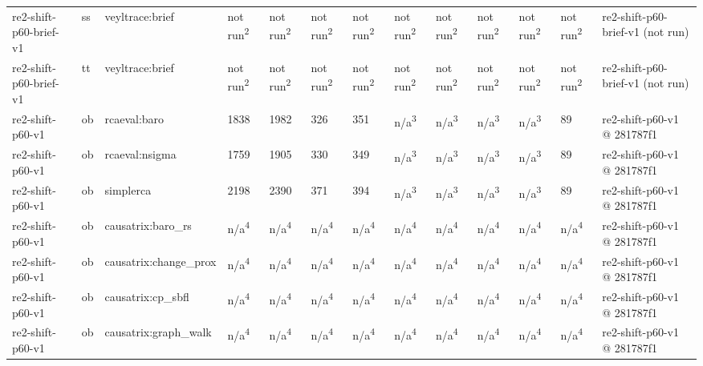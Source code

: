 \begin{table}[t]
\begin{tabular}{lllllllllllll}
re2-shift-p60-brief-v1 & ss & veyltrace:brief & not run\textsuperscript{2} & not run\textsuperscript{2} & not run\textsuperscript{2} & not run\textsuperscript{2} & not run\textsuperscript{2} & not run\textsuperscript{2} & not run\textsuperscript{2} & not run\textsuperscript{2} & not run\textsuperscript{2} & re2-shift-p60-brief-v1 (not run) \\
re2-shift-p60-brief-v1 & tt & veyltrace:brief & not run\textsuperscript{2} & not run\textsuperscript{2} & not run\textsuperscript{2} & not run\textsuperscript{2} & not run\textsuperscript{2} & not run\textsuperscript{2} & not run\textsuperscript{2} & not run\textsuperscript{2} & not run\textsuperscript{2} & re2-shift-p60-brief-v1 (not run) \\
re2-shift-p60-v1 & ob & rcaeval:baro & 1838 & 1982 & 326 & 351 & n/a\textsuperscript{3} & n/a\textsuperscript{3} & n/a\textsuperscript{3} & n/a\textsuperscript{3} & 89 & re2-shift-p60-v1 @ 281787f1 \\
re2-shift-p60-v1 & ob & rcaeval:nsigma & 1759 & 1905 & 330 & 349 & n/a\textsuperscript{3} & n/a\textsuperscript{3} & n/a\textsuperscript{3} & n/a\textsuperscript{3} & 89 & re2-shift-p60-v1 @ 281787f1 \\
re2-shift-p60-v1 & ob & simplerca & 2198 & 2390 & 371 & 394 & n/a\textsuperscript{3} & n/a\textsuperscript{3} & n/a\textsuperscript{3} & n/a\textsuperscript{3} & 89 & re2-shift-p60-v1 @ 281787f1 \\
re2-shift-p60-v1 & ob & causatrix:baro\_rs & n/a\textsuperscript{4} & n/a\textsuperscript{4} & n/a\textsuperscript{4} & n/a\textsuperscript{4} & n/a\textsuperscript{4} & n/a\textsuperscript{4} & n/a\textsuperscript{4} & n/a\textsuperscript{4} & n/a\textsuperscript{4} & re2-shift-p60-v1 @ 281787f1 \\
re2-shift-p60-v1 & ob & causatrix:change\_prox & n/a\textsuperscript{4} & n/a\textsuperscript{4} & n/a\textsuperscript{4} & n/a\textsuperscript{4} & n/a\textsuperscript{4} & n/a\textsuperscript{4} & n/a\textsuperscript{4} & n/a\textsuperscript{4} & n/a\textsuperscript{4} & re2-shift-p60-v1 @ 281787f1 \\
re2-shift-p60-v1 & ob & causatrix:cp\_sbfl & n/a\textsuperscript{4} & n/a\textsuperscript{4} & n/a\textsuperscript{4} & n/a\textsuperscript{4} & n/a\textsuperscript{4} & n/a\textsuperscript{4} & n/a\textsuperscript{4} & n/a\textsuperscript{4} & n/a\textsuperscript{4} & re2-shift-p60-v1 @ 281787f1 \\
re2-shift-p60-v1 & ob & causatrix:graph\_walk & n/a\textsuperscript{4} & n/a\textsuperscript{4} & n/a\textsuperscript{4} & n/a\textsuperscript{4} & n/a\textsuperscript{4} & n/a\textsuperscript{4} & n/a\textsuperscript{4} & n/a\textsuperscript{4} & n/a\textsuperscript{4} & re2-shift-p60-v1 @ 281787f1 \\

\end{tabular}
\end{table}
